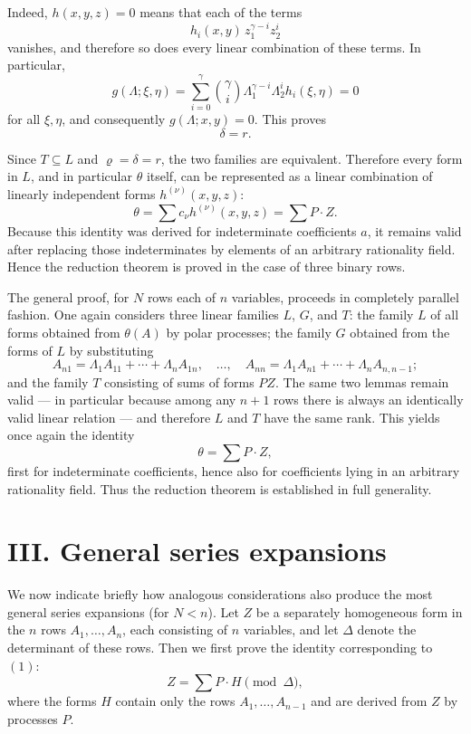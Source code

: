 \documentclass[11pt]{article}
\begin{document}
Indeed, \(h(x,y,z)=0\) means that each of the terms
\[
h_i(x,y)\,z_1^{\gamma-i}z_2^i
\]
vanishes, and therefore so does every linear combination of these terms. In particular,
\[
g(\Lambda;\xi,\eta)=\sum_{i=0}^{\gamma}\binom{\gamma}{i}\Lambda_1^{\gamma-i}\Lambda_2^i h_i(\xi,\eta)=0
\]
for all \(\xi,\eta\), and consequently \(g(\Lambda;x,y)=0\). This proves
\[
\delta=r.
\]

Since \(T\subseteq L\) and \(\varrho=\delta=r\), the two families are equivalent. Therefore every form in \(L\), and in particular \(\theta\) itself, can be represented as a linear combination of linearly independent forms \(h^{(\nu)}(x,y,z)\):
\[
\theta=\sum c_\nu h^{(\nu)}(x,y,z)=\sum P\cdot Z.
\]
Because this identity was derived for indeterminate coefficients \(a\), it remains valid after replacing those indeterminates by elements of an arbitrary rationality field. Hence the reduction theorem is proved in the case of three binary rows.

\medskip
The general proof, for \(N\) rows each of \(n\) variables, proceeds in completely parallel fashion. One again considers three linear families \(L\), \(G\), and \(T\): the family \(L\) of all forms obtained from \(\theta(A)\) by polar processes; the family \(G\) obtained from the forms of \(L\) by substituting
\[
A_{n1}=\Lambda_1A_{11}+\cdots+\Lambda_nA_{1n},\quad \dots,\quad
A_{nn}=\Lambda_1A_{n1}+\cdots+\Lambda_nA_{n,n-1};
\]
and the family \(T\) consisting of sums of forms \(PZ\). The same two lemmas remain valid --- in particular because among any \(n+1\) rows there is always an identically valid linear relation --- and therefore \(L\) and \(T\) have the same rank. This yields once again the identity
\[
\theta=\sum P\cdot Z,
\]
first for indeterminate coefficients, hence also for coefficients lying in an arbitrary rationality field. Thus the reduction theorem is established in full generality.

\section*{III. General series expansions}

We now indicate briefly how analogous considerations also produce the most general series expansions (for \(N<n\)). Let \(Z\) be a separately homogeneous form in the \(n\) rows \(A_1,\dots,A_n\), each consisting of \(n\) variables, and let \(\Delta\) denote the determinant of these rows. Then we first prove the identity corresponding to \((1)\):
\[
Z=\sum P\cdot H \pmod{\Delta},
\tag{2}
\]
where the forms \(H\) contain only the rows \(A_1,\dots,A_{n-1}\) and are derived from \(Z\) by processes \(P\).
\end{document}
